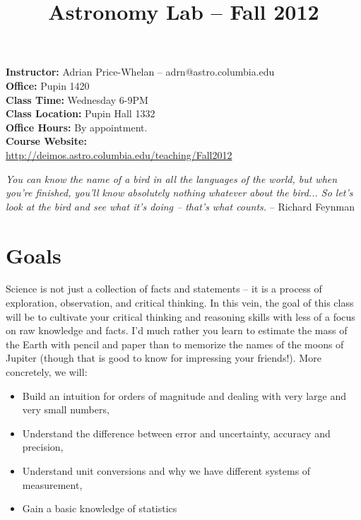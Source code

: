 \documentclass[12pt]{article}
\begin{document}
\title{\Huge Astronomy Lab -- Fall 2012}
\author{}
\date{}%

\maketitle

\thispagestyle{empty}

\vspace{-0.5in}
\large
\noindent\textbf{Instructor:} \hspace{0.1in} Adrian Price-Whelan  -- adrn@astro.columbia.edu\\
\textbf{Office:} \hspace{0.1in} Pupin 1420\\
\textbf{Class Time:} \hspace{0.1in} Wednesday 6-9PM\\
\textbf{Class Location:} \hspace{0.1in} Pupin Hall 1332\\
\textbf{Office Hours:} \hspace{0.1in} By appointment.\\

\noindent\textbf{Course Website:}\\ \url{http://deimos.astro.columbia.edu/teaching/Fall2012}\newline

\noindent\emph{You can know the name of a bird in all the languages of the world, but when you're finished, you'll know absolutely nothing whatever about the bird... So let's look at the bird and see what it's doing -- that's what counts.} -- Richard Feynman

\normalsize

\section*{Goals}
Science is not just a collection of facts and statements -- it is a process of exploration, observation, and critical thinking. In this vein, the goal of this class will be to cultivate your critical thinking and reasoning skills with less of a focus on raw knowledge and facts. I'd much rather you learn to estimate the mass of the Earth with pencil and paper than to memorize the names of the moons of Jupiter (though that is good to know for impressing your friends!). More concretely, we will:
\begin{itemize}
	\item Build an intuition for orders of magnitude and dealing with very large and very small numbers,
	\item Understand the difference between error and uncertainty, accuracy and precision,
	\item Understand unit conversions and why we have different systems of measurement,
	\item Gain a basic knowledge of statistics
\end{itemize}
\end{document}
